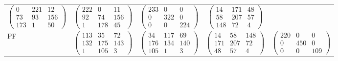 \begin{tabular}{p{0.5cm}cccc}
 $\begin{pmatrix}
       0  &     221  &      12 \\
      73  &      93  &     156 \\
     173  &       1  &      50 
\end{pmatrix}$
 & 
 $\begin{pmatrix}
     222  &       0  &      11 \\
      92  &      74  &     156 \\
       1  &     178  &      45 
\end{pmatrix}$
 & 
 $\begin{pmatrix}
     233  &       0  &       0 \\
       0  &     322  &       0 \\
       0  &       0  &     224 
\end{pmatrix}$
 & 
 $\begin{pmatrix}
      14  &     171  &      48 \\
      58  &     207  &      57 \\
     148  &      72  &       4 
\end{pmatrix}$
\\ 
PF & 
 $\begin{pmatrix}
     113  &      35  &      72 \\
     132  &     175  &     143 \\
       1  &     105  &       3 
\end{pmatrix}$
 & 
 $\begin{pmatrix}
      34  &     117  &      69 \\
     176  &     134  &     140 \\
     105  &       1  &       3 
\end{pmatrix}$
 & 
 $\begin{pmatrix}
      14  &      58  &     148 \\
     171  &     207  &      72 \\
      48  &      57  &       4 
\end{pmatrix}$
 & 
 $\begin{pmatrix}
     220  &       0  &       0 \\
       0  &     450  &       0 \\
       0  &       0  &     109 
\end{pmatrix}$
\\ 
\end{tabular}
